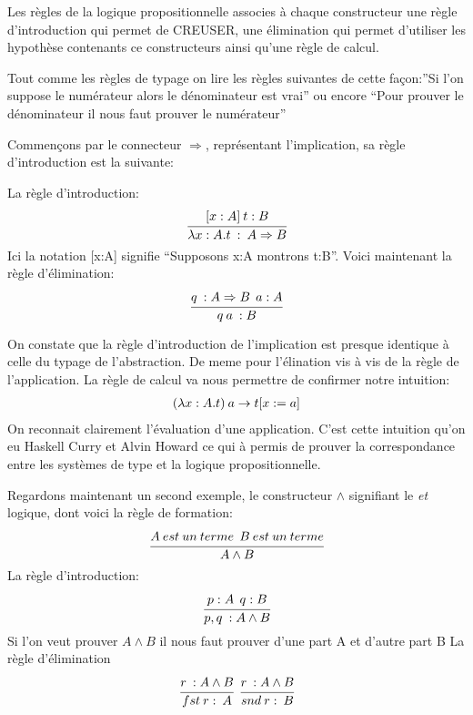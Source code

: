 \documentclass {article}
\theoremstyle{definition}
\theoremstyle{remark}
\begin{document}
Les règles de la logique propositionnelle associes à chaque constructeur 
une règle d'introduction qui permet de CREUSER, une élimination qui permet d'utiliser 
les hypothèse contenants ce constructeurs ainsi qu'une règle de calcul.

Tout comme les règles de typage on lire les règles suivantes de cette façon:''Si l'on suppose le numérateur
alors le dénominateur est vrai'' ou encore ``Pour prouver le dénominateur il nous faut prouver le numérateur''

Commençons par le connecteur $\Rightarrow$, représentant l'implication, sa règle d'introduction est la suivante:

La règle d'introduction:
\begin{align*}
  \cfrac{[x:A] \: t:B}
        {\lambda x:A.t\: :\: A\Rightarrow B}
\end{align*}
Ici la notation [x:A] signifie ``Supposons x:A montrons t:B''.
Voici maintenant la règle d'élimination:
\begin{align*}
  \cfrac{q\: :A\Rightarrow B\:\: a:A}
        {q\:a\: : B}
\end{align*}

On constate que la règle d'introduction de l'implication est presque identique à celle 
du typage de l'abstraction. De meme pour l'élination vis à vis de la règle de l'application.
La règle de calcul va nous permettre de confirmer notre intuition:
\begin{align*}
  (\lambda x:A. t)\:a\rightarrow t[x := a]
\end{align*}
On reconnait clairement l'évaluation d'une application. C'est cette intuition 
qu'on eu Haskell Curry et Alvin Howard ce qui à permis de prouver la correspondance
entre les systèmes de type et la logique propositionnelle.

Regardons maintenant un second exemple, le constructeur $\land$ signifiant le \emph{et} logique, dont voici la règle de 
formation:
\begin{align*}
\cfrac{A \:est\: un\: terme \:\: B\:est\:un\:terme}
{A\land B} 
\end{align*}
La règle d'introduction:
\begin{align*}
\cfrac{p:A\:\:q:B}
{p,q\: : A\land B}
\end{align*}
Si l'on veut prouver $A\land B$ il nous faut prouver d'une part A et d'autre part B
La règle d'élimination 
\begin{align*}
\cfrac{r\: : A\land B}
      {fst\:r:\:A} \:\:
      \cfrac{r\: : A\land B}
            {snd\:r:\:B}
\end{align*}
\end{document}

